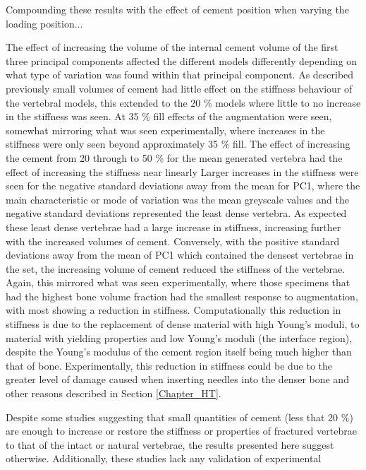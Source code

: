 Compounding these results with the effect of cement position when varying the loading position... %

The effect of increasing the volume of the internal cement volume of the first three principal components affected the different models differently depending on what type of variation was found within that principal component.
As described previously small volumes of cement had little effect on the stiffness behaviour of the vertebral models, this extended to the 20 \% models where little to no increase in the stiffness was seen.
At 35 \% fill effects of the augmentation were seen, somewhat mirroring what was seen experimentally, where increases in the stiffness were only seen beyond approximately 35 \% fill.
The effect of increasing the cement from 20 through to 50 \% for the mean generated vertebra had the effect of increasing the stiffness near linearly %
Larger increases in the stiffness were seen for the negative standard deviations away from the mean for PC1, where the main characteristic or mode of variation was the mean greyscale values and the negative standard deviations represented the least dense vertebra.
As expected these least dense vertebrae had a large increase in stiffness, increasing further with the increased volumes of cement.
Conversely, with the positive standard deviations away from the mean of PC1 which contained the densest vertebrae in the set, the increasing volume of cement reduced the stiffness of the vertebrae.
Again, this mirrored what was seen experimentally, where those specimens that had the highest bone volume fraction %
had the smallest response to augmentation, with most showing a reduction in stiffness.
Computationally this reduction in stiffness is due to the replacement of dense material with high Young's moduli, to material with yielding properties and low Young's moduli (the interface region), despite the Young's modulus of the cement region itself being much higher than that of bone.
Experimentally, this reduction in stiffness could be due to the greater level of damage caused when inserting needles into the denser bone and other reasons described in Section \ref{Chapter_HT}. %

Despite some studies suggesting that small quantities of cement (less that 20 \%) are enough to increase or restore the stiffness or properties of fractured vertebrae to that of the intact or natural vertebrae, the results presented here suggest otherwise.
Additionally, these studies lack any validation of experimental 

